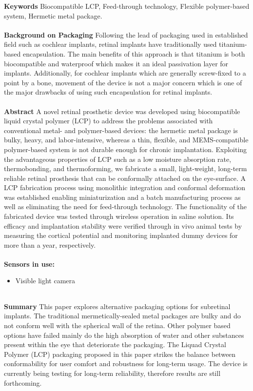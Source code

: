 \noindent
\textbf{Keywords} Biocompatible LCP, Feed-through technology, Flexible polymer-based system, Hermetic metal package. \\ \\

\noindent
\textbf{Background on Packaging} Following the lead of packaging used in established field such as cochlear implants, retinal implants have traditionally used titanium-based encapsulation. The main benefits of this approach is that titanium is both biocompatible and waterproof which makes it an ideal passivation layer for implants. Additionally, for cochlear implants which are generally screw-fixed to a point by a bone, movement of the device is not a major concern which is one of the major drawbacks of using such encapsulation for retinal implants. 
\\ \\

\noindent
\textbf{Abstract} A novel retinal prosthetic device was developed using biocompatible liquid crystal polymer (LCP) to address the problems associated with conventional metal- and polymer-based devices: the hermetic metal package is bulky, heavy, and labor-intensive, whereas a thin, flexible, and MEMS-compatible polymer-based system is not durable enough for chronic implantation. Exploiting the advantageous properties of LCP such as a low moisture absorption rate, thermobonding, and thermoforming, we fabricate a small, light-weight, long-term reliable retinal prosthesis that can be conformally attached on the eye-surface. A LCP fabrication process using monolithic integration and conformal deformation was established enabling miniaturization and a batch manufacturing process as well as eliminating the need for feed-through technology. The functionality of the fabricated device was tested through wireless operation in saline solution. Its efficacy and implantation stability were verified through in vivo animal tests by measuring the cortical potential and monitoring implanted dummy devices for more than a year, respectively. \\ \\

\noindent
\textbf{Sensors in use:}
\begin{itemize}
    \item Visible light camera \\ \\
\end{itemize}

\noindent
\textbf{Summary} This paper explores alternative packaging options for subretinal implants. The traditional mermetically-sealed metal packages are bulky and do not conform well with the spherical wall of the retina. Other polymer based options have failed mainly do the high absorption of water and other substances present within the eye that deteriorate the packaging. The Liquad Crystal Polymer (LCP) packaging proposed in this paper strikes the balance between conformability for user comfort and robustness for long-term usage. The device is currently being testing for long-term reliability, therefore results are still forthcoming. \\ \\


